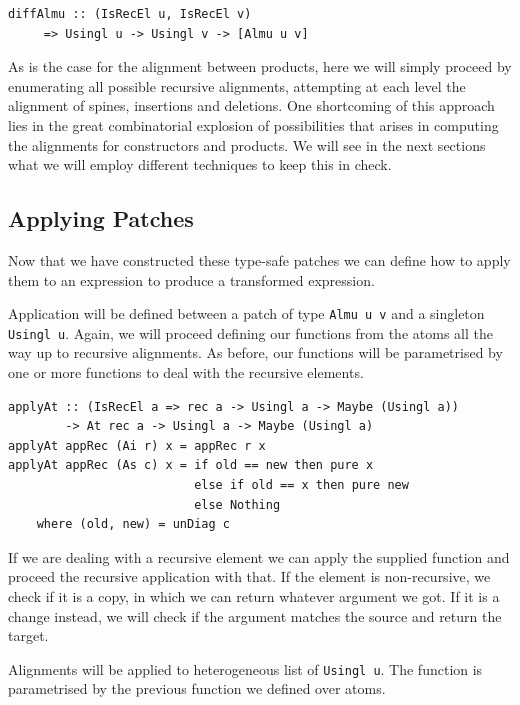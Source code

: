 \documentclass[11pt, titlepage]{article}
\begin{document}
\begin{verbatim}
diffAlmu :: (IsRecEl u, IsRecEl v) 
	 => Usingl u -> Usingl v -> [Almu u v]
\end{verbatim}

As is the case for the alignment between products, here we will simply proceed by enumerating all possible recursive alignments, attempting at each level the alignment of spines, insertions and deletions.
One shortcoming of this approach lies in the great combinatorial explosion of possibilities that arises in computing the alignments for constructors and products. We will see in the next sections what we will employ different techniques to keep this in check. 

\subsection{Applying Patches}\label{app_patches}

Now that we have constructed these type-safe patches we can define how to apply 
them to an expression to produce a transformed expression.

Application will be defined between a patch of type \texttt{Almu u v} and a 
singleton \texttt{Usingl u}. 
Again, we will proceed defining our functions from the atoms all the way up to 
recursive alignments. As before, our functions will be parametrised by one or 
more functions to deal with the recursive elements. 

\begin{verbatim}
applyAt :: (IsRecEl a => rec a -> Usingl a -> Maybe (Usingl a))
        -> At rec a -> Usingl a -> Maybe (Usingl a)
applyAt appRec (Ai r) x = appRec r x
applyAt appRec (As c) x = if old == new then pure x
                          else if old == x then pure new
                          else Nothing
    where (old, new) = unDiag c  
\end{verbatim}

If we are dealing with a recursive element we can apply the supplied function 
and proceed the recursive application with that.
If the element is non-recursive, we check if it is a copy, in which we can 
return whatever argument we got. If it is a change instead, we will check if the 
argument matches the source and return the target.

Alignments will be applied to heterogeneous list of \texttt{Usingl u}. The function is parametrised by the previous function we defined over atoms.
\end{document}
